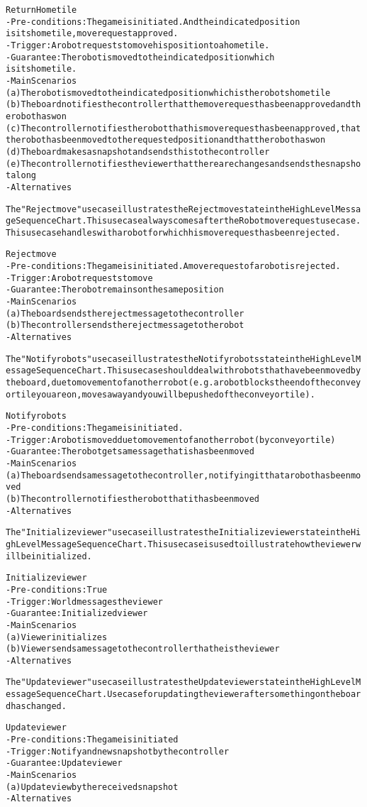 \begin{alltt}
Return Home tile
- Pre-conditions: The game is initiated. And the indicated position
    is its home tile, move request approved.
- Trigger: A robot requests to move his position to a home tile.
- Guarantee: The robot is moved to the indicated position which
    is its home tile.
- Main Scenarios
    (a) The robot is moved to the indicated position which is the robots home tile
    (b) The board notifies the controller that the move request has been approved and the robot has won
    (c) The controller notifies the robot that his move request has been approved, that the robot has been moved to the requested position and that the robot has won
    (d) The board makes a snapshot and sends this to the controller
    (e) The controller notifies the viewer that there are changes and sends the snapshot along
- Alternatives

The "Reject move" use case illustrates the Reject move state in the High Level Message Sequence Chart. This use case always comes after the Robot move request use case. This use case handles with a robot for which his move request has been rejected.

Reject move
- Pre-conditions: The game is initiated. A move request of a robot is rejected.
- Trigger: A robot requests to move
- Guarantee: The robot remains on the same position
- Main Scenarios
    (a) The board sends the reject message to the controller
    (b) The controller sends the reject message to the robot
- Alternatives

The "Notify robots" use case illustrates the Notify robots state in the High Level Message Sequence Chart. This use case should deal with robots that have been moved by the board, due to movement of another robot (e.g. a robot blocks the end of the conveyor tile you are on, moves away and you will be pushed of the conveyor tile).

Notify robots
- Pre-conditions: The game is initiated.
- Trigger: A robot is moved due to movement of another robot (by conveyor tile)
- Guarantee: The robot gets a message that is has been moved
- Main Scenarios
    (a) The board sends a message to the controller, notifying it that a robot has been moved
    (b) The controller notifies the robot that it has been moved
- Alternatives

The "Initialize viewer" use case illustrates the Initialize viewer state in the High Level Message Sequence Chart. This use case is used to illustrate how the viewer will be initialized.

Initialize viewer
- Pre-conditions: True
- Trigger: World messages the viewer
- Guarantee: Initialized viewer
- Main Scenarios
    (a) Viewer initializes
    (b) Viewer sends a message to the controller that he is the viewer
- Alternatives

The "Update viewer" use case illustrates the Update viewer state in the High Level Message Sequence Chart. Use case for updating the viewer after something on the board has changed.

Update viewer
- Pre-conditions: The game is initiated
- Trigger: Notify and new snapshot by the controller
- Guarantee: Update viewer
- Main Scenarios
    (a) Update view by the received snapshot
- Alternatives


\end{alltt}
